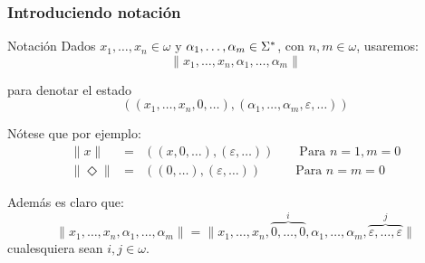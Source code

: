 \begin{frame}
	\frametitle{Introduciendo notación}

	\begin{block}{Notación}
		\PN Dados $x_{1}, \dotsc, x_{n} \in \omega$ y $\alpha_{1}, \dotsc,\alpha_{m} \in \Sigma^{\ast}$, con $n, m \in \omega $,
		usaremos:
		\begin{equation*}
			\lVert x_{1}, \dotsc, x_{n}, \alpha_{1}, \dotsc, \alpha_{m} \rVert
		\end{equation*}

		\PN para denotar el estado
		\begin{equation*}
			\left((x_{1}, \dotsc, x_{n}, 0, \dotsc), (\alpha_{1}, \dotsc, \alpha_{m}, \varepsilon, \dotsc)\right)
		\end{equation*}
	\end{block}

	\PN Nótese que por ejemplo:
	\begin{eqnarray*}
		\lVert x \rVert &=& \left((x, 0, \dotsc), (\varepsilon, \dotsc)\right) \qquad \text{Para } n = 1, m = 0 \\
		\lVert \Diamond \rVert &=& \left((0, \dotsc), (\varepsilon, \dotsc)\right) \qquad \ \ \; \text{Para } n = m = 0
	\end{eqnarray*}

	\PN Además es claro que:
	\[
		\lVert x_{1}, \dotsc, x_{n}, \alpha_{1}, \dotsc, \alpha_{m} \rVert = \lVert x_{1}, \dotsc, x_{n},
		\overset{i}{\overbrace{0, \dotsc, 0}}, \alpha_{1}, \dotsc, \alpha_{m}, \overset{j}{\overbrace{\varepsilon, \dotsc,
		\varepsilon}} \rVert
	\]
	\PN cualesquiera sean $i, j \in \omega$.
\end{frame}

